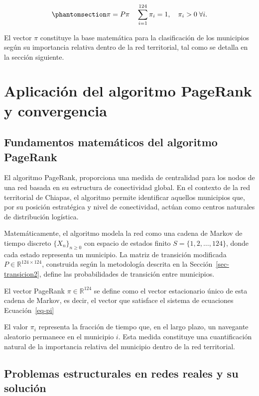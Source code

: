 \documentclass[
  spanish,
  us-letterpaper,
]{scrreprt}
\numberwithin{equation}{section}
\begin{document}
\begin{equation}\phantomsection\label{eq-pi}{
\pi = P\pi \quad \sum_{i=1}^{124} \pi_i = 1, \quad \pi_i > 0 \; \forall i.
}\end{equation}

El vector \(\pi\) constituye la base matemática para la clasificación de
los municipios según su importancia relativa dentro de la red
territorial, tal como se detalla en la sección siguiente.

\section{Aplicación del algoritmo PageRank y
convergencia}\label{sec-aplicaionpagerank}

\subsection{Fundamentos matemáticos del algoritmo
PageRank}\label{fundamentos-matemuxe1ticos-del-algoritmo-pagerank}

El algoritmo PageRank, proporciona una medida de centralidad para los
nodos de una red basada en su estructura de conectividad global. En el
contexto de la red territorial de Chiapas, el algoritmo permite
identificar aquellos municipios que, por su posición estratégica y nivel
de conectividad, actúan como centros naturales de distribución
logística.

Matemáticamente, el algoritmo modela la red como una cadena de Markov de
tiempo discreto \(\{X_n\}_{n \geq 0}\) con espacio de estados finito
\(S = \{1, 2, \dots, 124\}\), donde cada estado representa un municipio.
La matriz de transición modificada
\(P \in \mathbb{R}^{124 \times 124}\), construida según la metodología
descrita en la Sección~\ref{sec-transicion2}, define las probabilidades
de transición entre municipios.

El vector PageRank \(\pi \in \mathbb{R}^{124}\) se define como el vector
estacionario único de esta cadena de Markov, es decir, el vector que
satisface el sistema de ecuaciones Ecuación~\ref{eq-pi}

El valor \(\pi_i\) representa la fracción de tiempo que, en el largo
plazo, un navegante aleatorio permanece en el municipio \(i\). Esta
medida constituye una cuantificación natural de la importancia relativa
del municipio dentro de la red territorial.

\subsection{Problemas estructurales en redes reales y su
solución}\label{problemas-estructurales-en-redes-reales-y-su-soluciuxf3n}
\end{document}
